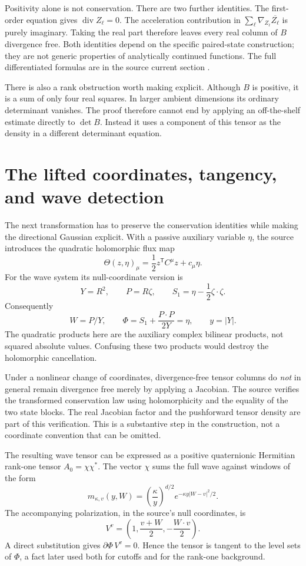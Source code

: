 \documentclass[11pt,a4paper]{article}
\numberwithin{equation}{section}
\theoremstyle{definition}
\theoremstyle{remark}
\newcommand{\diver}{\operatorname{div}}
\begin{document}
Positivity alone is not conservation. There are two further identities. The
first-order equation gives $\diver Z_\ell=0$. The acceleration contribution
in $\sum_\ell\nabla_{Z_\ell}\overline{Z_\ell}$ is purely imaginary.
Taking the real part therefore leaves every real column of $B$ divergence
free. Both identities depend on the specific paired-state construction;
they are not generic properties of analytically continued functions.
The full differentiated formulas are in the source current section
\cite{current}.

There is also a rank obstruction worth making explicit. Although $B$ is
positive, it is a sum of only four real squares. In larger ambient dimensions
its ordinary determinant vanishes. The proof therefore cannot end by applying
an off-the-shelf estimate directly to $\det B$. Instead it uses a component of
this tensor as the density in a different determinant equation.

\section{The lifted coordinates, tangency, and wave detection}
\label{sec:lift}
The next transformation has to preserve the conservation identities while
making the directional Gaussian explicit. With a passive auxiliary variable
$\eta$, the source introduces the quadratic holomorphic flux map
\[
 \Theta(z,\eta)_\mu=\frac12z^{\mathsf T}C^\mu z+c_\mu\eta.
\]
For the wave system its null-coordinate version is
\[
 Y=R^2,\qquad P=R\zeta,\qquad S_1=\eta-\frac12\zeta\cdot\zeta.
\]
Consequently
\begin{equation}\label{eq:firstintegral}
 W=P/Y,\qquad
 \Phi=S_1+\frac{P\cdot P}{2Y}=\eta,
 \qquad y=|Y|.
\end{equation}
The quadratic products here are the auxiliary complex bilinear products,
not squared absolute values. Confusing these two products would destroy the
holomorphic cancellation.

Under a nonlinear change of coordinates, divergence-free tensor columns do
\emph{not} in general remain divergence free merely by applying a Jacobian.
The source verifies the transformed conservation law using holomorphicity and
the equality of the two state blocks. The real Jacobian factor and the
pushforward tensor density are part of this verification. This is a substantive
step in the construction, not a coordinate convention that can be omitted.

The resulting wave tensor can be expressed as a positive quaternionic Hermitian
rank-one tensor $A_0=\chi\chi^*$. The vector $\chi$ sums the full wave against
windows of the form
\begin{equation}\label{eq:window}
 m_{\kappa,v}(y,W)
   =\left(\frac\kappa y\right)^{d/2}
       e^{-\kappa y|W-v|^2/2}.
\end{equation}
The accompanying polarization, in the source's null coordinates, is
\[
 V^v=\left(1,\frac{v+W}{2},-\frac{W\cdot v}{2}\right).
\]
A direct substitution gives $\partial\Phi\,V^v=0$. Hence the tensor is
tangent to the level sets of $\Phi$, a fact later used both for cutoffs and
for the rank-one background.
\end{document}
